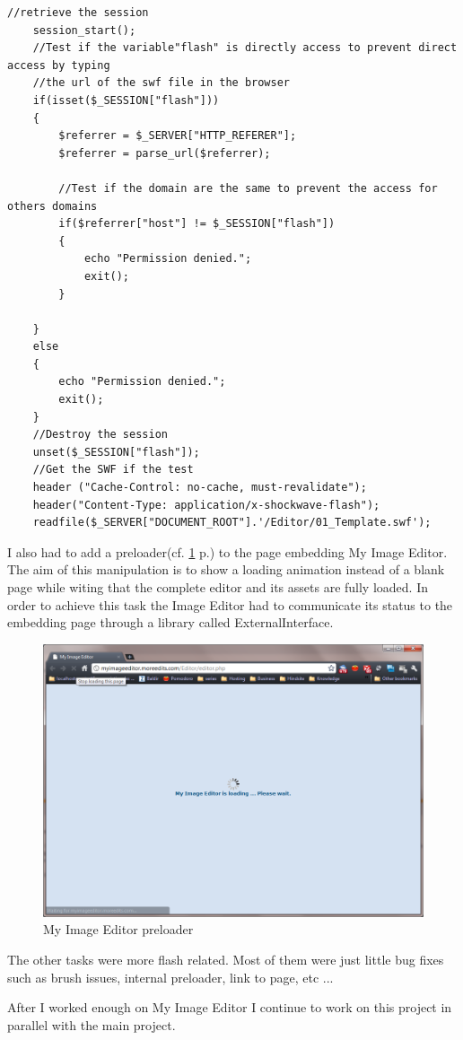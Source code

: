 \lstset{language=PHP}
\begin{lstlisting}[label=swf-secure,caption=PHP script disguised into a swf file to avoid direct download]
	//retrieve the session
	session_start();
	//Test if the variable"flash" is directly access to prevent direct access by typing
	//the url of the swf file in the browser
	if(isset($_SESSION["flash"]))
	{
		$referrer = $_SERVER["HTTP_REFERER"];
		$referrer = parse_url($referrer);

		//Test if the domain are the same to prevent the access for others domains
		if($referrer["host"] != $_SESSION["flash"])
		{
			echo "Permission denied.";
			exit();
		}

	}
	else
	{
		echo "Permission denied.";
		exit();
	}
	//Destroy the session
	unset($_SESSION["flash"]);
	//Get the SWF if the test	
	header ("Cache-Control: no-cache, must-revalidate");
	header("Content-Type: application/x-shockwave-flash");
	readfile($_SERVER["DOCUMENT_ROOT"].'/Editor/01_Template.swf');
\end{lstlisting}


I also had to add a preloader(cf. \ref{figure:ewc-image_preloader} p.\pageref{figure:ewc-image_preloader}) to the page embedding My Image Editor. The aim of this manipulation is to show a loading animation instead of a blank page while witing that the complete editor and its assets are fully loaded. In order to achieve this task the Image Editor had to communicate its status to the embedding page through a library called ExternalInterface. 

\begin{figure}[!h]
\centering
\includegraphics[width=.80\textwidth]{img/myimage_preloader.png}
\caption{My Image Editor preloader}
\label{figure:ewc-image_preloader}
\end{figure}

The other tasks were more flash related. Most of them were just little bug fixes such as brush issues, internal preloader, link to page, etc ...

After I worked enough on My Image Editor I continue to work on this project in parallel with the main project.